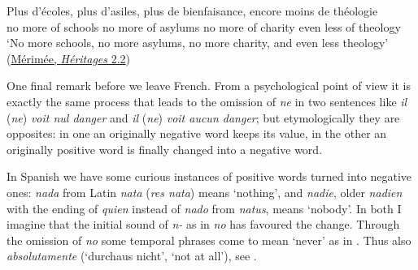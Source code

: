 \ea \label{ex:03-19}
\gll Plus d'écoles, plus d'asiles, plus de bienfaisance, encore moins de théologie\\
 {no more} {of schools} {no more} {of asylums} {no more} of charity even less of theology\\ %
\glt `No more schools, no more asylums, no more charity, and even less theology'
\hfill(\href{https://archive.org/details/lesdeuxhritages02gogogoog/page/n59/mode/2up?q=%22plus+d%27%C3%A9coles%2C+plus+d%27asiles%2C+Plus+de+bienfaisance%2C+encore+moins+de+theologie.%22&view=theater}{Mérimée, \textit{Héritages} 2.2})
\z{}

One final remark before we leave French. From a psychological point of view it is exactly the same process that leads to the omission of \textit{ne} in two sentences like \textit{il} (\textit{ne})\textit{ voit nul danger} and \textit{il} (\textit{ne})\textit{ voit aucun danger}; but etymologically they are opposites: in one an originally negative word keeps its value, in the other an originally positive word is finally changed into a negative word.


In Spanish we have some curious instances of positive words turned into negative ones: \textit{nada} from Latin \textit{nata} (\textit{res nata}) means `nothing', and \textit{nadie}, older \textit{nadien} with the ending of \textit{quien} instead of \textit{nado} from \textit{natus}, means `nobody'. In both I imagine that the initial sound of \textit{n-} as in \textit{no} has favoured the change. Through the omission of \textit{no} some temporal phrases come to mean `never' as in . Thus also \textit{absolutamente} (`durchaus nicht', `not at all'), see \citet[\href{https://archive.org/details/spanischegrammat00hansuoft/page/204/mode/2up?q=absolutamente&view=theater}{§60, 5}]{hanssen1910spanische}.

